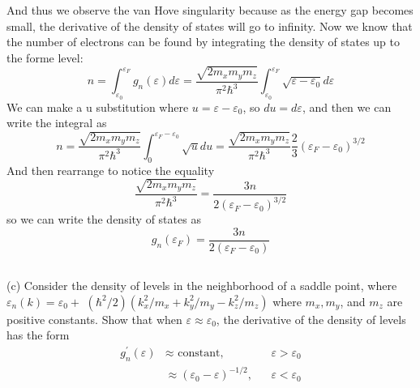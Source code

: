 \documentclass[12pt]{article}
\begin{document}
And thus we observe the van Hove singularity because as the energy gap becomes small, the derivative of the density of states will go to infinity. Now we know that the number of electrons can be found by integrating the density of states up to the forme level:
\begin{equation}
n = \int_{\varepsilon_0}^{\varepsilon_F} g_n(\varepsilon) d\varepsilon = \frac{\sqrt{2m_x m_y m_z}}{\pi^2 \hbar^3}\int_{\varepsilon_0}^{\varepsilon_F} \sqrt{\varepsilon - \varepsilon_0} d\varepsilon
\end{equation}
We can make a u substitution where $u = \varepsilon - \varepsilon_0$, so $du = d\varepsilon$, and then we can write the integral as
\begin{equation}
n = \frac{\sqrt{2m_x m_y m_z}}{\pi^2 \hbar^3}\int_{0}^{\varepsilon_F - \varepsilon_0} \sqrt{u} du = \frac{\sqrt{2m_x m_y m_z}}{\pi^2 \hbar^3}\frac{2}{3}\left(\varepsilon_F - \varepsilon_0\right)^{3/2}
\end{equation}
And then rearrange to notice the equality
\begin{equation}
\frac{\sqrt{2m_x m_y m_z}}{\pi^2 \hbar^3} = \frac{3n}{2\left(\varepsilon_F - \varepsilon_0\right)^{3/2}}
\end{equation}
so we can write the density of states as
\begin{equation}
g_n\left(\varepsilon_F\right) = \frac{3n}{2\left(\varepsilon_F - \varepsilon_0\right)}
\end{equation}
\subsection{}
(c) Consider the density of levels in the neighborhood of a saddle point, where $\varepsilon_n(k)=\varepsilon_0+$ $\left(\hbar^2 / 2\right)\left(k_x^2 / m_x+k_y^2 / m_y-k_z^2 / m_z\right)$ where $m_x, m_y$, and $m_z$ are positive constants. Show that when $\varepsilon \approx \varepsilon_0$, the derivative of the density of levels has the form
$$
\begin{aligned}
g_n^{\prime}(\varepsilon) & \approx \text { constant, } & & \varepsilon>\varepsilon_0 \\
& \approx\left(\varepsilon_0-\varepsilon\right)^{-1 / 2}, & & \varepsilon<\varepsilon_0
\end{aligned}
$$
\end{document}
